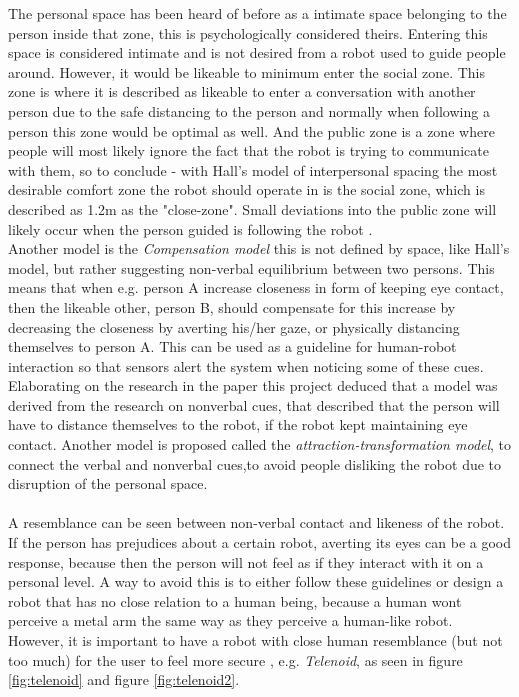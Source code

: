 The personal space has been heard of before as a intimate space belonging to the person inside that zone, this is psychologically considered theirs. Entering this space is considered intimate and is not desired from a robot used to guide people around. However, it would be likeable to minimum enter the social zone. This zone is where it is described as likeable to enter a conversation with another person due to the safe distancing to the person and normally when following a person this zone would be optimal as well. And the public zone is a zone where people will most likely ignore the fact that the robot is trying to communicate with them, so to conclude - with Hall's model of interpersonal spacing the most desirable comfort zone the robot should operate in is the social zone, which is described as 1.2m as the "close-zone". Small deviations into the public zone will likely occur when the person guided is following the robot \cite{Hall}.\\

Another model is the \textit{Compensation model} this is not defined by space, like Hall's model, but rather suggesting non-verbal equilibrium between two persons. This means that when e.g. person A increase closeness in form of keeping eye contact, then the likeable other, person B, should compensate for this increase by decreasing the closeness by averting his/her gaze, or physically distancing themselves to person A. This can be used as a guideline for human-robot interaction so that sensors alert the system when noticing some of these cues.\\
Elaborating on the research in the paper this project deduced that a model was derived from the research on nonverbal cues, that described that the person will have to distance themselves to the robot, if the robot kept maintaining eye contact. Another model is proposed called the \textit{attraction-transformation model}, to connect the verbal and nonverbal cues,to avoid people disliking the robot due to disruption of the personal space.\\
\\
A resemblance can be seen between non-verbal contact and likeness of the robot. If the person has prejudices about a certain robot, averting its eyes can be a good response, because then the person will not feel as if they interact with it on a personal level. A way to avoid this is to either follow these guidelines or design a robot that has no close relation to a human being, because a human wont perceive a metal arm the same way as they perceive a human-like robot. However, it is important to have a robot with close human resemblance (but not too much) for the user to feel more secure \cite{mumm2011human}, e.g. \textit{Telenoid}, as seen in figure \ref{fig:telenoid} and figure \ref{fig:telenoid2}.

